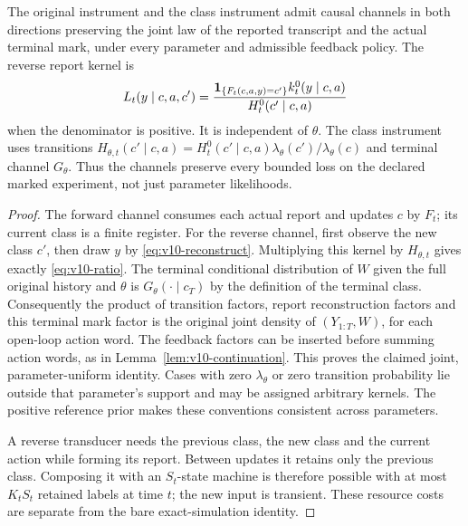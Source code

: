 \begin{theorem}\label{thm:v10-reconstruction}
The original instrument and the class instrument admit causal
channels in both directions preserving the joint law of the reported
transcript and the actual terminal mark, under every parameter and
admissible feedback policy. The reverse report kernel is
\begin{equation}\label{eq:v10-reconstruct}
 L_t(y\mid c,a,c')=
 \frac{\mathbf 1_{\{F_t(c,a,y)=c'\}}k^0_t(y\mid c,a)}
      {H^0_t(c'\mid c,a)}
\end{equation}
when the denominator is positive. It is independent of $\theta$.
The class instrument uses transitions
$H_{\theta,t}(c'\mid c,a)
=H^0_t(c'\mid c,a)\lambda_\theta(c')/\lambda_\theta(c)$
and terminal channel $G_\theta$. Thus the channels preserve every
bounded loss on the declared marked experiment, not just parameter
likelihoods.
\end{theorem}
\begin{proof}
The forward channel consumes each actual report and updates $c$ by
$F_t$; its current class is a finite register. For the reverse channel,
first observe the new class $c'$, then draw $y$ by
\eqref{eq:v10-reconstruct}. Multiplying this kernel by
$H_{\theta,t}$ gives exactly \eqref{eq:v10-ratio}. The terminal
conditional distribution of $W$ given the full original history and
$\theta$ is $G_\theta(\cdot\mid c_T)$ by the definition of the terminal
class. Consequently the product of transition factors, report
reconstruction factors and this terminal mark factor is the original
joint density of $(Y_{1:T},W)$, for each open-loop action word.
The feedback factors can be inserted before summing action words,
as in Lemma~\ref{lem:v10-continuation}. This proves the claimed joint,
parameter-uniform identity. Cases with zero $\lambda_\theta$ or zero
transition probability lie outside that parameter's support and may
be assigned arbitrary kernels. The positive reference prior makes
these conventions consistent across parameters.

A reverse transducer needs the previous class, the new class and the
current action while forming its report. Between updates it retains
only the previous class. Composing it with an $S_t$-state machine is
therefore possible with at most $K_tS_t$ retained labels at time $t$;
the new input is transient. These resource costs are separate from
the bare exact-simulation identity.
\end{proof}

